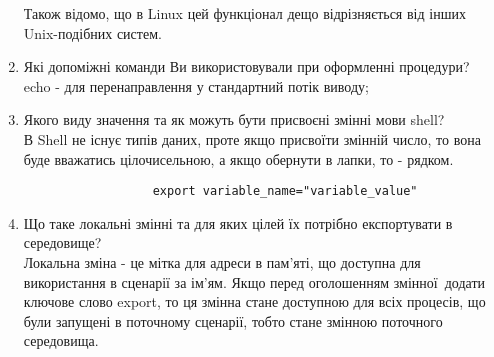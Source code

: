 \begin{enumerate}
            Також відомо, що в Linux цей функціонал дещо відрізняється
            від інших Unix-подібних систем.
      \item Які допоміжні команди Ви використовували при оформленні процедури? \\
            echo - для перенаправлення у стандартний потік виводу;
      \item Якого виду значення та як можуть бути присвоєні змінні мови shell? \\
            В Shell не існує типів даних, проте якщо присвоїти змінній число,
            то вона буде вважатись цілочисельною,
            а якщо обернути в лапки, то - рядком.
            \begin{verbatim}
                  export variable_name="variable_value"
            \end{verbatim}
      \item Що таке локальні змінні та для яких цілей
            їх потрібно експортувати в середовище? \\
            Локальна зміна - це мітка для адреси в пам'яті,
            що доступна для використання в сценарії за ім'ям.
            Якщо перед оголошенням змінної додати ключове слово export,
            то ця змінна стане доступною для всіх процесів,
            що були запущені в поточному сценарії,
            тобто стане змінною поточного середовища.
\end{enumerate}
